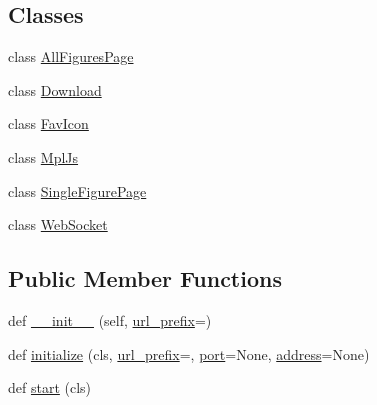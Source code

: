 \subsection*{Classes}
\begin{DoxyCompactItemize}
\item 
class \hyperlink{classmatplotlib_1_1backends_1_1backend__webagg_1_1WebAggApplication_1_1AllFiguresPage}{All\+Figures\+Page}
\item 
class \hyperlink{classmatplotlib_1_1backends_1_1backend__webagg_1_1WebAggApplication_1_1Download}{Download}
\item 
class \hyperlink{classmatplotlib_1_1backends_1_1backend__webagg_1_1WebAggApplication_1_1FavIcon}{Fav\+Icon}
\item 
class \hyperlink{classmatplotlib_1_1backends_1_1backend__webagg_1_1WebAggApplication_1_1MplJs}{Mpl\+Js}
\item 
class \hyperlink{classmatplotlib_1_1backends_1_1backend__webagg_1_1WebAggApplication_1_1SingleFigurePage}{Single\+Figure\+Page}
\item 
class \hyperlink{classmatplotlib_1_1backends_1_1backend__webagg_1_1WebAggApplication_1_1WebSocket}{Web\+Socket}
\end{DoxyCompactItemize}
\subsection*{Public Member Functions}
\begin{DoxyCompactItemize}
\item 
def \hyperlink{classmatplotlib_1_1backends_1_1backend__webagg_1_1WebAggApplication_a8f9737f04ae67abf9b96d55f5b932c49}{\+\_\+\+\_\+init\+\_\+\+\_\+} (self, \hyperlink{classmatplotlib_1_1backends_1_1backend__webagg_1_1WebAggApplication_ad032f94c2450dea7588cb7508e8a76a8}{url\+\_\+prefix}=\textquotesingle{}\textquotesingle{})
\item 
def \hyperlink{classmatplotlib_1_1backends_1_1backend__webagg_1_1WebAggApplication_a56f5575844363f524ffdc92868376696}{initialize} (cls, \hyperlink{classmatplotlib_1_1backends_1_1backend__webagg_1_1WebAggApplication_ad032f94c2450dea7588cb7508e8a76a8}{url\+\_\+prefix}=\textquotesingle{}\textquotesingle{}, \hyperlink{classmatplotlib_1_1backends_1_1backend__webagg_1_1WebAggApplication_a810f02be2d21230af17021e4d776784b}{port}=None, \hyperlink{classmatplotlib_1_1backends_1_1backend__webagg_1_1WebAggApplication_a10d1d8cdc7e6ba29d785963ce3494df6}{address}=None)
\item 
def \hyperlink{classmatplotlib_1_1backends_1_1backend__webagg_1_1WebAggApplication_a7790d0573aa7729a1b429e362e10c784}{start} (cls)
\end{DoxyCompactItemize}
